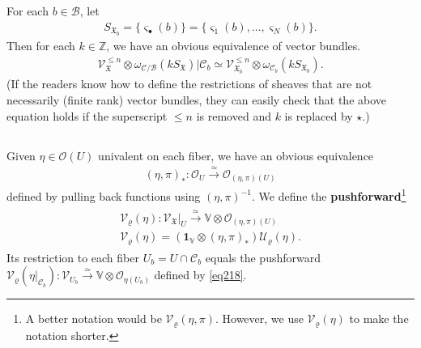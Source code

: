 \documentclass[11pt,b5paper,notitlepage]{article}
\theoremstyle{definition}
\theoremstyle{plain}
\newcommand{\fk}{\mathfrak}
\newcommand{\mc}{\mathcal}
\newcommand{\id}{\mathbf{1}}
\newcommand{\scr}{\mathscr}
\newcommand{\sgm}{\varsigma}
\newcommand{\SX}{{S_{\fk X}}}
\newcommand{\blt}{\bullet}
\newcommand{\Vbb}{\mathbb V}
\newcommand{\Zbb}{\mathbb Z}
\newcommand{\SXb}{{S_{\fk X_b}}}
\numberwithin{equation}{section}
\begin{document}
For each $b\in\mc B$, let \index{SXb@$\SXb=\{\sgm_1(b),\dots,\sgm_N(b)\}$}
\begin{align}
\SXb=\{\sgm_\blt(b)\}=\{\sgm_1(b),\dots,\sgm_N(b)\}.
\end{align}
Then for each $k\in\Zbb$, we have an obvious equivalence of vector bundles.
\begin{align}
\scr V_{\fk X}^{\leq n}\otimes\omega_{\mc C/\mc B}(k\SX)\big|{\mc C_b}\simeq\scr V_{\fk X_b}^{\leq n}\otimes\omega_{\mc C_b}(k\SXb).
\end{align}
(If the readers know how to define the restrictions of sheaves that are not necessarily (finite rank) vector bundles, they can easily check that the above equation holds if the superscript $\leq n$ is removed and $k$ is replaced by $\star$.)



\subsection{}

Given $\eta\in\scr O(U)$ univalent on each fiber, we have an obvious equivalence
\begin{align}
(\eta,\pi)_*:\scr O_U\xrightarrow{\simeq}\scr O_{(\eta,\pi)(U)}
\end{align}
defined by pulling back functions using $(\eta,\pi)^{-1}$. We define the \textbf{pushforward}\footnote{A better notation would be $\mc V_\varrho(\eta,\pi)$. However, we use $\mc V_\varrho(\eta)$ to make the notation shorter.} \index{V@$\mc V_\varrho(\eta_i),\mc V_\varrho(\varphi)$}
\begin{gather}\label{eq233}
\begin{gathered}
\mc V_\varrho(\eta):\scr V_{\fk X}|_U\xrightarrow{\simeq}\Vbb\otimes\scr O_{(\eta,\pi)(U)}\\
\mc V_\varrho(\eta)=(\id_\Vbb\otimes(\eta,\pi)_*)\mc U_\varrho(\eta).
\end{gathered}
\end{gather}
Its restriction to each fiber $U_b=U\cap\mc C_b$ equals the pushforward $\mc V_\varrho(\eta|_{\mc C_b}):\scr V_{U_b}\xrightarrow{\simeq}\Vbb\otimes\scr O_{\eta(U_b)}$ defined by \eqref{eq218}.
\end{document}
